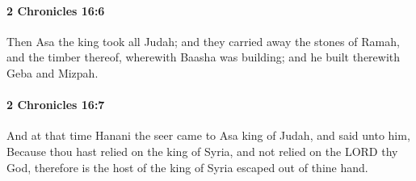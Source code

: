 		\paragraph{2 Chronicles 16:6} %
			\label{2CHRONICLES-16-6}

			Then Asa the king took all Judah; and they carried away the stones of Ramah, and the timber thereof, wherewith Baasha was building; and he built therewith Geba and Mizpah.


		\paragraph{2 Chronicles 16:7} %
			\label{2CHRONICLES-16-7}

			And at that time Hanani the seer came to Asa king of Judah, and said unto him, Because thou hast relied on the king of Syria, and not relied on the LORD thy God, therefore is the host of the king of Syria escaped out of thine hand.

